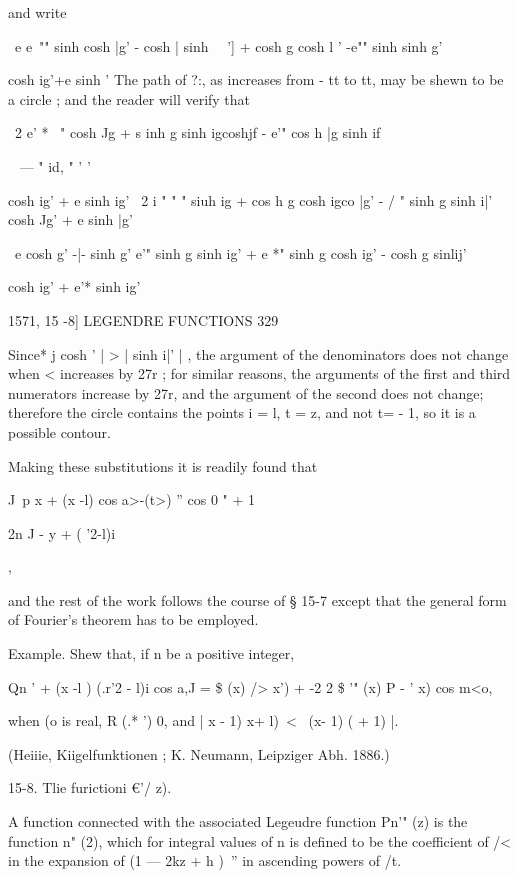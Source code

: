 {{{and write

\ e e~"" sinh cosh |g' - cosh | sinh \ \ '] + cosh g cosh l ' -e""
sinh sinh g'

cosh ig'+e sinh ' The path of ?:, as increases from - tt to tt, may be
shewn to be a circle ; and the reader will verify that

\ 2 e' * ~" cosh Jg + s inh g sinh igcoshjf - e'" cos h |g sinh if

 ~ — " id, " ' '

cosh ig' + e sinh ig' \ 2 i " " " siuh ig + cos h g cosh igco |g' - /
" sinh g sinh i|' cosh Jg' + e sinh |g'



\ e cosh g' -|- sinh g' e'" sinh g sinh ig' + e *" sinh g cosh ig' -
cosh g sinlij'

cosh ig' + e'* sinh ig'



1571, 15 -8] LEGENDRE FUNCTIONS 329

Since* j cosh ' | > | sinh i|' | , the argument of the denominators
does not change when < increases by 27r ; for similar reasons, the
arguments of the first and third numerators increase by 27r, and the
argument of the second does not change; therefore the circle contains
the points i = l, t = z, and not t= - 1, so it is a possible contour.

Making these substitutions it is readily found that



J\ p x + (x -l) cos a>-(t>) '' cos 0 " + 1



2n J - y + ( '2-l)i



 ,



and the rest of the work follows the course of § 15-7 except that the
general form of Fourier's theorem has to be employed.

Example. Shew that, if n be a positive integer,

Qn ' + (x -l ) (.r'2 - l)i cos a,J = \$ (x) /> x') + -2 2 \$ '" (x) P
- ' x) cos m<o,

when (o is real, R (.* ') 0, and | x - 1) x+ l)\ < \ (x- 1) ( + 1) |.

(Heiiie, Kiigelfunktionen ; K. Neumann, Leipziger Abh. 1886.)

15-8. Tlie furictioni €'/ z).

A function connected with the associated Legeudre function Pn'" (z) is
the function n" (2), which for integral values of n is defined to be
the coefficient of /< in the expansion of (1 — 2kz + h )~'' in
ascending powers of /t.

}}}
